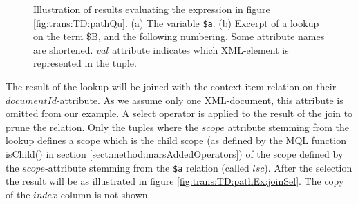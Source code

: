 \begin{myExample}
\begin{figure}[h]
\centering
{}
\qquad
{}
\caption[Evaluating the expression of figure \ref{fig:trans:TD:pathQu}]{Illustration of results evaluating the
expression in figure \ref{fig:trans:TD:pathQu}. (a) The variable \texttt{\$a}.
(b) Excerpt of a lookup on the term \textsf{\$B}, and the following numbering. Some attribute names are shortened. $val$ attribute indicates which
XML-element is represented in the tuple.
\label{fig:trans:TD:pathEx}}
\end{figure}

The result of the lookup will be joined with the context item relation on their $documentId$-attribute. As we
assume only one XML-document, this attribute is omitted from our example. A \textsf{select} operator is applied to
the result of the join to prune the relation. Only the tuples where the $scope$ attribute stemming from the lookup
defines a scope which is the child scope (as defined by the MQL function \textsf{isChild() in section
\ref{sect:method:marsAddedOperators}}) of the scope defined by the $scope$-attribute stemming from the
\texttt{\$a} relation (called $lsc$). After the selection the result will be as illustrated in figure
\ref{fig:trans:TD:pathEx:joinSel}. The copy of the $index$ column is not shown.


\end{myExample}
